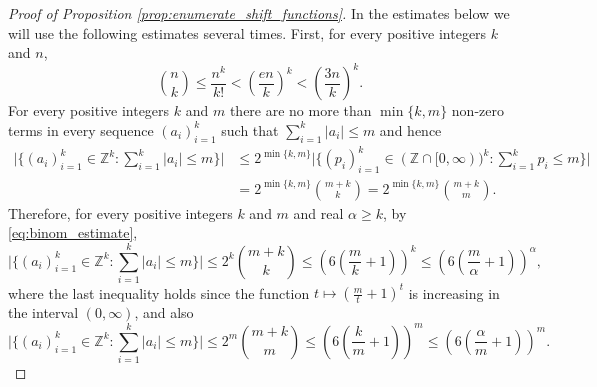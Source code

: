 \documentclass[11pt, reqno]{amsart}
\numberwithin{equation}{section}
\begin{document}
\begin{proof}[Proof of Proposition \ref{prop:enumerate_shift_functions}]
In the estimates below we will use the following estimates several times. First, for every positive integers $k$ and $n$,
\begin{equation}
\label{eq:binom_estimate}
\binom{n}{k}\leq 
\frac{n^k}{k!}<\left(\frac{en}{k}\right)^k<\left(\frac{3n}{k}\right)^k.
\end{equation}
For every positive integers $k$ and $m$ there are no more than $\min\{k,m\}$ non-zero terms in every sequence $(a_i)_{i=1}^k$ such that $\sum_{i=1}^k\lvert a_i\rvert\leq m$ and hence
\begin{align*}
\lvert\{(a_i)_{i=1}^k\in{\mathbb Z}^k\colon \sum_{i=1}^k\lvert a_i\rvert\leq m\}\rvert&\leq 2^{\min\{k,m\}}\lvert\{(p_i)_{i=1}^k\in({\mathbb Z}\cap[0,\infty))^k\colon \sum_{i=1}^k p_i\leq m\}\rvert\\
&=2^{\min\{k,m\}}\binom{m+k}{k}=2^{\min\{k,m\}}\binom{m+k}{m}.
\end{align*}
Therefore, for every positive integers $k$ and $m$ and real $\alpha\geq k$, by \eqref{eq:binom_estimate},
\begin{equation}\label{eq:l_1_cube_1}
\lvert\{(a_i)_{i=1}^k\in{\mathbb Z}^k\colon \sum_{i=1}^k\lvert a_i\rvert\leq m\}\rvert\leq 2^k\binom{m+k}{k}\leq \left(6\left(\frac{m}{k}+1\right)\right)^k\leq \left(6\left(\frac{m}{\alpha}+1\right)\right)^{\alpha},
\end{equation}
where the last inequality holds since the function $t\mapsto \left(\frac{m}{t}+1\right)^t$ is increasing in the interval $(0,\infty)$, and also
\begin{equation}\label{eq:l_1_cube_2}
\lvert\{(a_i)_{i=1}^k\in{\mathbb Z}^k\colon \sum_{i=1}^k\lvert a_i\rvert\leq m\}\rvert\leq 2^m\binom{m+k}{m}\leq \left(6\left(\frac{k}{m}+1\right)\right)^m\leq \left(6\left(\frac{\alpha}{m}+1\right)\right)^m.
\end{equation}


\end{proof}
\end{document}
